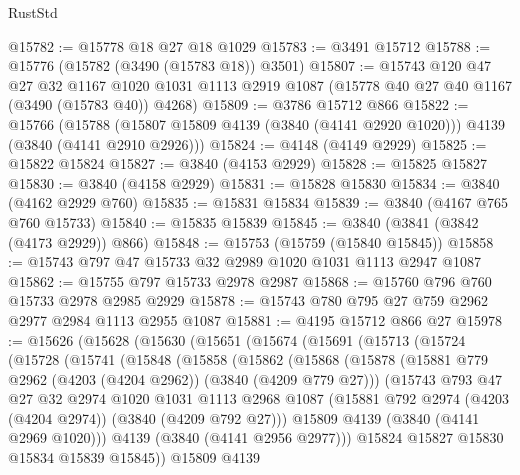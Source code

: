 \begin{lexlean}{RustStd}
\begin{coremodule}
@15782 := @15778 @18 @27 @18 @1029
@15783 := @3491 @15712
@15788 := @15776 (@15782 (@3490 (@15783 @18)) @3501)
@15807 := @15743
    @120
    @47
    @27
    @32
    @1167
    @1020
    @1031
    @1113
    @2919
    @1087
    (@15778 @40 @27 @40 @1167 (@3490 (@15783 @40)) @4268)
@15809 := @3786 @15712 @866
@15822 := @15766
    (@15788 (@15807 @15809 @4139 (@3840 (@4141 @2920 @1020))) @4139 (@3840 (@4141 @2910 @2926)))
@15824 := @4148 (@4149 @2929)
@15825 := @15822 @15824
@15827 := @3840 (@4153 @2929)
@15828 := @15825 @15827
@15830 := @3840 (@4158 @2929)
@15831 := @15828 @15830
@15834 := @3840 (@4162 @2929 @760)
@15835 := @15831 @15834
@15839 := @3840 (@4167 @765 @760 @15733)
@15840 := @15835 @15839
@15845 := @3840 (@3841 (@3842 (@4173 @2929)) @866)
@15848 := @15753 (@15759 (@15840 @15845))
@15858 := @15743 @797 @47 @15733 @32 @2989 @1020 @1031 @1113 @2947 @1087
@15862 := @15755 @797 @15733 @2978 @2987
@15868 := @15760 @796 @760 @15733 @2978 @2985 @2929
@15878 := @15743 @780 @795 @27 @759 @2962 @2977 @2984 @1113 @2955 @1087
@15881 := @4195 @15712 @866 @27
@15978 := @15626
    (@15628
      (@15630
        (@15651
          (@15674
            (@15691
              (@15713
                (@15724
                  (@15728
                    (@15741
                      (@15848
                        (@15858
                          (@15862
                            (@15868
                              (@15878
                                (@15881 @779 @2962 (@4203 (@4204 @2962)) (@3840 (@4209 @779 @27)))
                                (@15743
                                  @793
                                  @47
                                  @27
                                  @32
                                  @2974
                                  @1020
                                  @1031
                                  @1113
                                  @2968
                                  @1087
                                  (@15881 @792 @2974 (@4203 (@4204 @2974)) (@3840 (@4209 @792 @27)))
                                  @15809
                                  @4139
                                  (@3840 (@4141 @2969 @1020)))
                                @4139
                                (@3840 (@4141 @2956 @2977)))
                              @15824
                              @15827
                              @15830
                              @15834
                              @15839
                              @15845))
                          @15809
                          @4139

\end{coremodule}
\end{lexlean}
